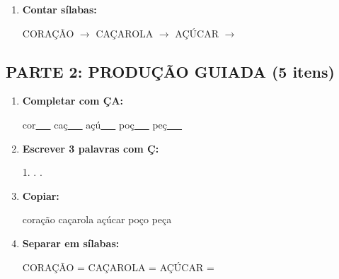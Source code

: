 \begin{exercicio}
\begin{enumerate}
  \item \textbf{Contar sílabas:}
  \begin{center}
  CORAÇÃO $\rightarrow$ \underline{\hspace{0.9cm}} \quad CAÇAROLA $\rightarrow$ \underline{\hspace{0.9cm}} \quad AÇÚCAR $\rightarrow$ \underline{\hspace{0.9cm}}
  \end{center}

\end{enumerate}

\subsection*{PARTE 2: PRODUÇÃO GUIADA (5 itens)}

\begin{enumerate}[resume]

  \item \textbf{Completar com ÇA:}
  \begin{center}
  cor\underline{~~~} \quad caç\underline{~~~} \quad açú\underline{~~~} \quad poç\underline{~~~} \quad peç\underline{~~~}
  \end{center}

  \item \textbf{Escrever 3 palavras com Ç:}
  \begin{center}
  1. \underline{\hspace{3cm}} . \underline{\hspace{3cm}} . \underline{\hspace{3cm}}
  \end{center}

  \item \textbf{Copiar:}
  \begin{center}
  coração \quad caçarola \quad açúcar \quad poço \quad peça
  \end{center}

  \item \textbf{Separar em sílabas:}
  \begin{center}
  CORAÇÃO = \underline{\hspace{1cm}} \underline{\hspace{1cm}} \quad CAÇAROLA = \underline{\hspace{1cm}} \underline{\hspace{1cm}} \quad AÇÚCAR = \underline{\hspace{1cm}} \underline{\hspace{1cm}}
  \end{center}


\end{enumerate}
\end{exercicio}
